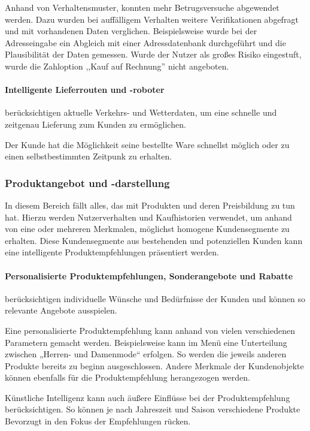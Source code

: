 Anhand von Verhaltensmuster, konnten mehr Betrugsversuche abgewendet werden. Dazu wurden bei auffälligem Verhalten weitere Verifikationen abgefragt und mit vorhandenen Daten verglichen. Beispielsweise wurde bei der Adresseingabe ein Abgleich mit einer Adressdatenbank durchgeführt und die Plausibilität der Daten gemessen. Wurde der Nutzer als großes Risiko eingestuft, wurde die Zahloption ,,Kauf auf Rechnung'' nicht angeboten.

\paragraph{Intelligente Lieferrouten und -roboter} berücksichtigen aktuelle Verkehrs- und Wetterdaten, um eine schnelle und zeitgenau Lieferung zum Kunden zu ermöglichen.

Der Kunde hat die Möglichkeit seine bestellte Ware schnellst möglich oder zu einen selbstbestimmten Zeitpunk zu erhalten. 

\subsubsection{Produktangebot und -darstellung}
In diesem Bereich fällt alles, das mit Produkten und deren Preisbildung zu tun hat. Hierzu werden Nutzerverhalten und Kaufhistorien verwendet, um anhand von eine oder mehreren Merkmalen, möglichst homogene Kundensegmente zu erhalten. Diese Kundensegmente aus bestehenden und potenziellen Kunden kann eine intelligente Produktempfehlungen präsentiert werden.

\paragraph{Personalisierte Produktempfehlungen, Sonderangebote und Rabatte} berücksichtigen individuelle Wünsche und Bedürfnisse der Kunden und können so relevante Angebote ausspielen.\vspace{0.2cm}

Eine personalisierte Produktempfehlung kann anhand von vielen verschiedenen Parametern gemacht werden. Beispielsweise kann im Menü eine Unterteilung zwischen „Herren- und Damenmode“ erfolgen. So werden die jeweils anderen Produkte bereits zu beginn ausgeschlossen. Andere Merkmale der Kundenobjekte können ebenfalls für die Produktempfehlung herangezogen werden.\vspace{0.2cm}

Künstliche Intelligenz kann auch äußere Einflüsse bei der Produktempfehlung berücksichtigen. So können je nach Jahreszeit und Saison verschiedene Produkte Bevorzugt in den Fokus der Empfehlungen rücken.\vspace{0.2cm}

